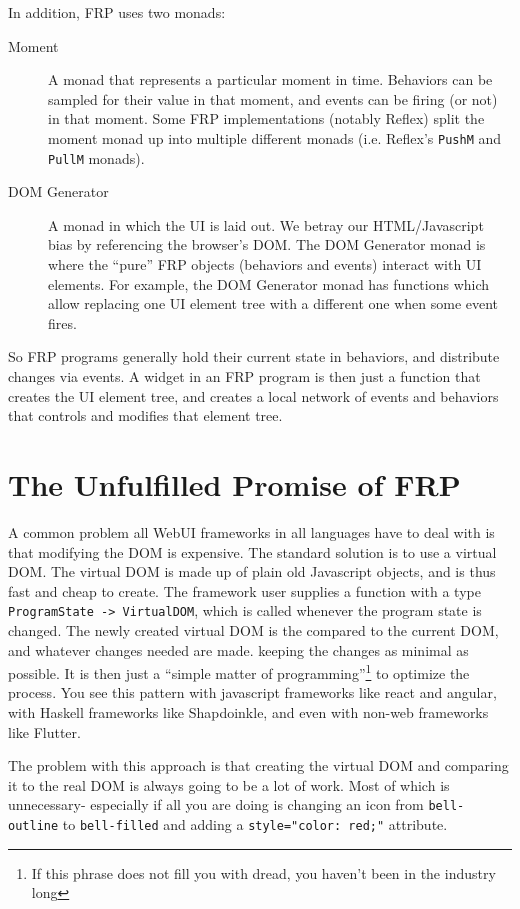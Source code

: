 \documentclass{article}
\begin{document}
In addition, FRP uses two monads:
\begin{description}
\item[Moment] A monad that represents a particular moment in time.
Behaviors can be sampled for their value in that moment, and events can
be firing (or not) in that moment.  Some FRP implementations (notably
Reflex) split the moment monad up into multiple different monads (i.e.
Reflex's \verb|PushM| and \verb|PullM| monads).
\item[DOM Generator] A monad in which the UI is laid out.  We betray our
HTML/Javascript bias by referencing the browser's DOM.  The DOM
Generator monad is where the ``pure'' FRP objects (behaviors and events)
interact with UI elements.  For example, the DOM Generator monad has
functions which allow replacing one UI element tree with a different
one when some event fires.
\end{description}

So FRP programs generally hold their current state in behaviors, and
distribute changes via events.  A widget in an FRP program is then just
a function that creates the UI element tree, and creates a local network
of events and behaviors that controls and modifies that element tree.

\section{The Unfulfilled Promise of FRP}

A common problem all WebUI frameworks in all languages have to deal with
is that modifying the DOM is expensive.  The standard solution is to
use a virtual DOM.  The virtual DOM is made up of plain old Javascript
objects, and is thus fast and cheap to create.  The framework user
supplies a function with a type \verb|ProgramState -> VirtualDOM|, which
is called whenever the program state is changed.  The newly created
virtual DOM is the compared to the current DOM, and whatever changes
needed are made. keeping the changes as minimal as possible.  It is then
just a ``simple matter of programming''\footnote{If this phrase does not
fill you with dread, you haven't been in the industry long} to optimize
the process.  You see this pattern with javascript frameworks like react
and angular, with Haskell frameworks like Shapdoinkle, and even with
non-web frameworks like Flutter.

The problem with this approach is that creating the virtual DOM and
comparing it to the real DOM is always going to be a lot of work.  Most
of which is unnecessary- especially if all you are doing is changing
an icon from \verb|bell-outline| to \verb|bell-filled| and adding a
\verb|style="color: red;"| attribute.
\end{document}
